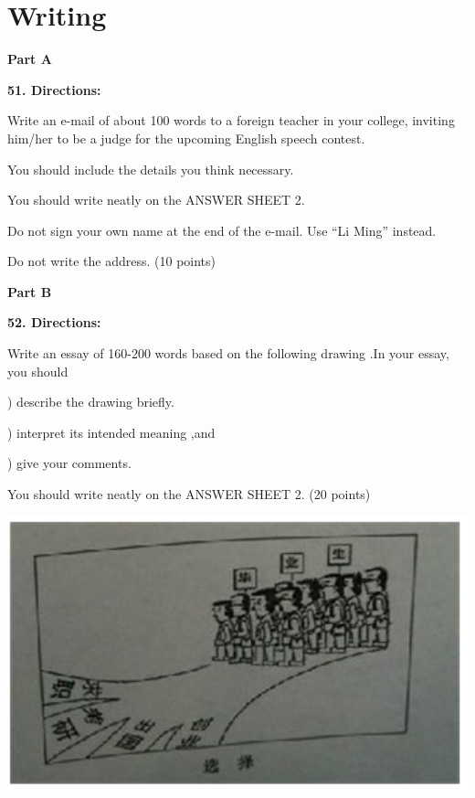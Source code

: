 
\section{Writing}
\textbf{Part A}

\textbf{51. Directions:}

\qquad Write an e-mail of about 100 words to a foreign teacher in your college, inviting him/her to be a judge for the upcoming English speech contest.

\qquad You should include the details you think necessary.

\qquad You should write neatly on the ANSWER SHEET 2.

\qquad Do not sign your own name at the end of the e-mail. Use ``Li Ming'' instead.

\qquad Do not write the address. (10 points)

\vspace{6pt}

\textbf{Part B}

\textbf{52. Directions:}

\qquad Write an essay of 160-200 words based on the following drawing .In your essay, you should

) describe the drawing briefly.

) interpret its intended meaning ,and

) give your comments.

\qquad You should write neatly on the ANSWER SHEET 2. (20 points)

\begin{center}\includegraphics[width=14cm]{8.png}\end{center}